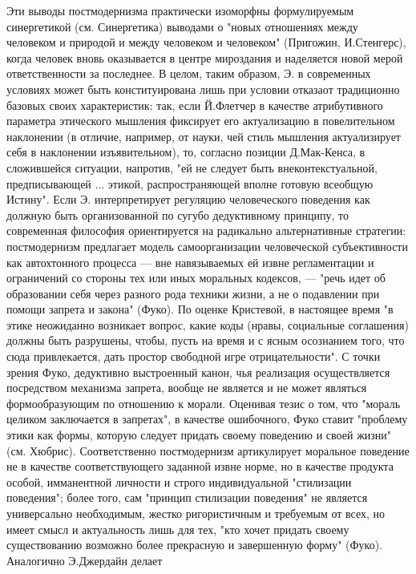 \documentclass[12pt]{article}
\begin{document}
Эти  выводы  постмодернизма
практически  изоморфны  формулируемым  синергетикой  (см.  Синергетика)  выводами  о  "новых  отношениях
между человеком и природой и между человеком и человеком" (Пригожин, И.Стенгерс), когда человек вновь
оказывается в центре мироздания и наделяется новой мерой ответственности за последнее. В целом, таким
образом, Э. в современных условиях может быть конституирована лишь при условии отказаот традиционно
базовых своих характеристик: так, если Й.Флетчер в качестве атрибутивного параметра этического мышления
фиксирует его актуализацию в повелительном наклонении (в отличие, например, от науки, чей стиль мышления
актуализирует себя в наклонении изъявительном), то, согласно позиции Д.Мак-Кенса, в сложившейся ситуации,
напротив, "ей не следует быть внеконтекстуальной, предписывающей ... этикой, распространяющей вполне
готовую всеобщую Истину". Если Э. интерпретирует регуляцию человеческого поведения как должную быть
организованной по сугубо дедуктивному принципу, то современная философия ориентируется на радикально
альтернативные стратегии: постмодернизм предлагает модель самоорганизации человеческой субъективности
как автохтонного процесса — вне навязываемых ей извне регламентации и ограничений со стороны тех или
иных  моральных кодексов, —  "речь идет об образовании себя через разного  рода  техники жизни,  а  не о
подавлении  при  помощи  запрета  и  закона"  (Фуко).  По  оценке  Кристевой,  в  настоящее  время  "в  этике 
неожиданно возникает вопрос, какие коды (нравы, социальные соглашения) должны быть разрушены, чтобы,
пусть  на  время  и  с  ясным  осознанием  того,  что  сюда  привлекается,  дать  простор  свободной  игре
отрицательности".  С  точки  зрения  Фуко,  дедуктивно  выстроенный  канон,  чья  реализация  осуществляется
посредством механизма запрета, вообще не является и не может являться формообразующим по отношению к
морали. Оценивая тезис о том, что "мораль целиком заключается в запретах", в качестве ошибочного, Фуко
ставит "проблему этики как формы, которую следует придать своему поведению и своей жизни" (см. Хюбрис).
Соответственно постмодернизм артикулирует моральное поведение не в качестве соответствующего заданной
извне норме, но в качестве продукта особой, имманентной личности и строго индивидуальной "стилизации
поведения"; более того, сам "принцип стилизации поведения" не является универсально необходимым, жестко
ригористичным и требуемым от всех, но имеет смысл и актуальность лишь для тех, "кто хочет придать своему
существованию возможно более прекрасную и завершенную форму" (Фуко). Аналогично Э.Джердайн делает
\end{document}
